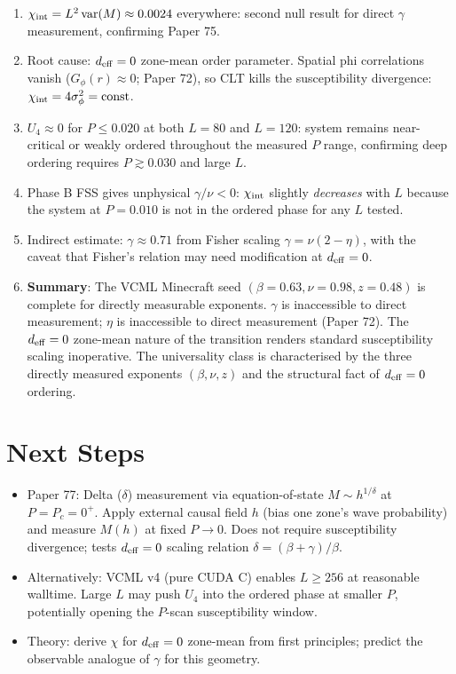 \documentclass[11pt,a4paper]{article}
\begin{document}
\begin{enumerate}
  \item $\chi_{\rm int} = L^2\,\mathrm{var}(M) \approx 0.0024$ everywhere: second
    null result for direct $\gamma$ measurement, confirming Paper 75.

  \item Root cause: $d_{\rm eff} = 0$ zone-mean order parameter.  Spatial phi
    correlations vanish ($G_\phi(r) \approx 0$; Paper 72), so CLT kills the
    susceptibility divergence: $\chi_{\rm int} = 4\sigma_\phi^2 = \mathrm{const}$.

  \item $U_4 \approx 0$ for $P \leq 0.020$ at both $L=80$ and $L=120$:
    system remains near-critical or weakly ordered throughout the measured $P$ range,
    confirming deep ordering requires $P \gtrsim 0.030$ and large $L$.

  \item Phase B FSS gives unphysical $\gamma/\nu < 0$: $\chi_{\rm int}$ slightly
    \emph{decreases} with $L$ because the system at $P=0.010$ is not in the
    ordered phase for any $L$ tested.

  \item Indirect estimate: $\gamma \approx 0.71$ from Fisher scaling $\gamma = \nu(2-\eta)$,
    with the caveat that Fisher's relation may need modification at $d_{\rm eff}=0$.

  \item \textbf{Summary}: The VCML Minecraft seed $(β=0.63, \nu=0.98, z=0.48)$ is
    complete for directly measurable exponents.  $\gamma$ is inaccessible to direct
    measurement; $\eta$ is inaccessible to direct measurement (Paper 72).
    The $d_{\rm eff} = 0$ zone-mean nature of the transition renders standard
    susceptibility scaling inoperative.  The universality class is characterised by
    the three directly measured exponents $(\beta, \nu, z)$ and the structural
    fact of $d_{\rm eff} = 0$ ordering.
\end{enumerate}

\section{Next Steps}

\begin{itemize}
  \item Paper 77: Delta ($\delta$) measurement via equation-of-state $M \sim h^{1/\delta}$
    at $P = P_c = 0^+$.  Apply external causal field $h$ (bias one zone's wave
    probability) and measure $M(h)$ at fixed $P \to 0$.  Does not require susceptibility
    divergence; tests $d_{\rm eff}=0$ scaling relation $\delta = (\beta + \gamma)/\beta$.
  \item Alternatively: VCML v4 (pure CUDA C) enables $L \geq 256$ at reasonable
    walltime.  Large $L$ may push $U_4$ into the ordered phase at smaller $P$,
    potentially opening the $P$-scan susceptibility window.
  \item Theory: derive $\chi$ for $d_{\rm eff}=0$ zone-mean from first principles;
    predict the observable analogue of $\gamma$ for this geometry.
\end{itemize}
\end{document}
